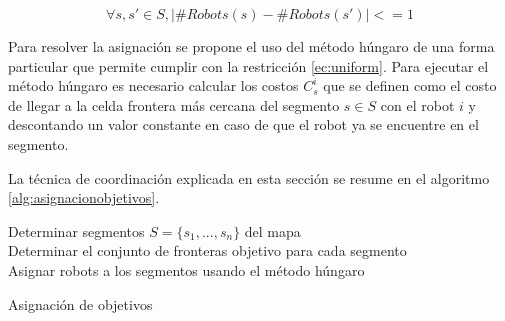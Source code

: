 \begin{equation}\label{ec:uniform}
  \forall s,s' \in S, |\#Robots(s) - \#Robots(s')| <= 1
\end{equation}

Para resolver la asignación se propone el uso del método húngaro\cite{kuhn1955hungarian} de una forma particular que permite cumplir con la restricción \ref{ec:uniform}. Para ejecutar el método húngaro es necesario calcular los costos $C_{s}^{i}$ que se definen como el costo de llegar a la celda frontera más cercana del segmento $s \in S$ con el robot $i$ y descontando un valor constante en caso de que el robot ya se encuentre en el segmento. 

La técnica de coordinación explicada en esta sección se resume en el algoritmo \ref{alg:asignacionobjetivos}.

\begin{algorithm}
\SetAlgoLined
    Determinar segmentos $S = \{s_{1} , ..., s_{n} \}$ del mapa\\
    Determinar el conjunto de fronteras objetivo para cada segmento\\
    Asignar robots a los segmentos usando el método húngaro\\
    \caption{Asignación de objetivos}
    \label{alg:asignacionobjetivos}
\end{algorithm}


